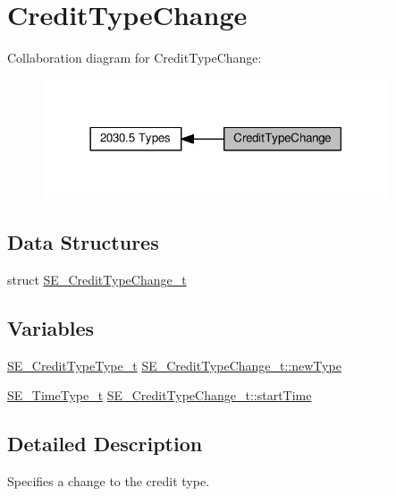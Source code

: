 \hypertarget{group__CreditTypeChange}{}\section{Credit\+Type\+Change}
\label{group__CreditTypeChange}
Collaboration diagram for Credit\+Type\+Change\+:\nopagebreak
\begin{figure}[H]
\begin{center}
\leavevmode
\includegraphics[width=290pt]{group__CreditTypeChange}
\end{center}
\end{figure}
\subsection*{Data Structures}
\begin{DoxyCompactItemize}
\item 
struct \hyperlink{structSE__CreditTypeChange__t}{S\+E\+\_\+\+Credit\+Type\+Change\+\_\+t}
\end{DoxyCompactItemize}
\subsection*{Variables}
\begin{DoxyCompactItemize}
\item 
\hyperlink{group__CreditTypeType_ga5a63742e5c65087df17ed6ad8f420b5e}{S\+E\+\_\+\+Credit\+Type\+Type\+\_\+t} \hyperlink{group__CreditTypeChange_ga41afe9d77d6e3eeacda417610bf56ba8}{S\+E\+\_\+\+Credit\+Type\+Change\+\_\+t\+::new\+Type}
\item 
\hyperlink{group__TimeType_ga6fba87a5b57829b4ff3f0e7638156682}{S\+E\+\_\+\+Time\+Type\+\_\+t} \hyperlink{group__CreditTypeChange_ga729481edafcc434e3a9cf600f627b423}{S\+E\+\_\+\+Credit\+Type\+Change\+\_\+t\+::start\+Time}
\end{DoxyCompactItemize}


\subsection{Detailed Description}
Specifies a change to the credit type. 

